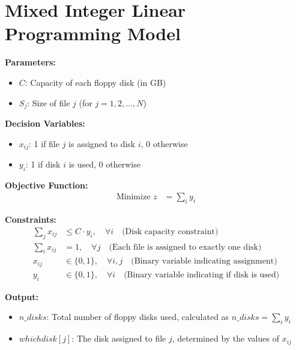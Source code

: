 \documentclass{article}
\begin{document}
\section*{Mixed Integer Linear Programming Model}

\textbf{Parameters:}
\begin{itemize}
    \item $C$: Capacity of each floppy disk (in GB)
    \item $S_j$: Size of file $j$ (for $j = 1, 2, \ldots, N$)
\end{itemize}

\textbf{Decision Variables:}
\begin{itemize}
    \item $x_{ij}$: 1 if file $j$ is assigned to disk $i$, 0 otherwise
    \item $y_i$: 1 if disk $i$ is used, 0 otherwise
\end{itemize}

\textbf{Objective Function:}
\begin{align}
\text{Minimize } z & = \sum_{i} y_i
\end{align}

\textbf{Constraints:}
\begin{align}
\sum_{j} x_{ij} & \leq C \cdot y_i, \quad \forall i \quad \text{(Disk capacity constraint)} \\
\sum_{i} x_{ij} & = 1, \quad \forall j \quad \text{(Each file is assigned to exactly one disk)} \\
x_{ij} & \in \{0, 1\}, \quad \forall i,j \quad \text{(Binary variable indicating assignment)} \\
y_i & \in \{0, 1\}, \quad \forall i \quad \text{(Binary variable indicating if disk is used)}
\end{align}

\textbf{Output:}
\begin{itemize}
    \item $n\_disks$: Total number of floppy disks used, calculated as $n\_disks = \sum_{i} y_i$
    \item $whichdisk[j]$: The disk assigned to file $j$, determined by the values of $x_{ij}$
\end{itemize}
\end{document}
